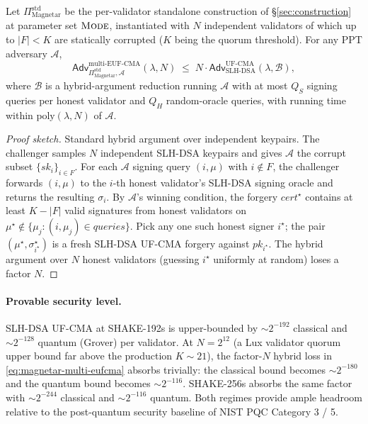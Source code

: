 \begin{theorem}
\label{thm:magnetar-multi-eufcma}
Let $\Pi^{\mathrm{std}}_{\mathrm{Magnetar}}$ be the per-validator
standalone construction of \S\ref{sec:construction} at parameter set
$\textsc{Mode}$, instantiated with $N$ independent validators of
which up to $|F| < K$ are statically corrupted ($K$ being the
quorum threshold). For any PPT adversary $\mathcal{A}$,
\begin{equation}
  \mathsf{Adv}^{\mathrm{multi\text{-}EUF\text{-}CMA}}_{
  \Pi^{\mathrm{std}}_{\mathrm{Magnetar}}, \mathcal{A}}(\lambda, N)
  \;\le\;
  N \cdot
  \mathsf{Adv}^{\mathrm{UF\text{-}CMA}}_{\mathrm{SLH\text{-}DSA}}(
  \lambda, \mathcal{B}),
\label{eq:magnetar-multi-eufcma}
\end{equation}
where $\mathcal{B}$ is a hybrid-argument reduction running
$\mathcal{A}$ with at most $Q_S$ signing queries per honest
validator and $Q_H$ random-oracle queries, with running time
within $\mathrm{poly}(\lambda, N)$ of $\mathcal{A}$.
\end{theorem}

\begin{proof}[Proof sketch]
Standard hybrid argument over independent keypairs. The
challenger samples $N$ independent SLH-DSA keypairs and gives
$\mathcal{A}$ the corrupt subset $\{sk_i\}_{i \in F}$. For each
$\mathcal{A}$ signing query $(i, \mu)$ with $i \notin F$, the
challenger forwards $(i, \mu)$ to the $i$-th honest validator's
SLH-DSA signing oracle and returns the resulting $\sigma_i$. By
$\mathcal{A}$'s winning condition, the forgery
$\mathit{cert}^\star$ contains at least $K - |F|$ valid
signatures from honest validators on $\mu^\star \notin
\{\mu_{j} : (i, \mu_j) \in \mathit{queries}\}$. Pick any one such
honest signer $i^\star$; the pair
$(\mu^\star, \sigma_{i^\star}^\star)$ is a fresh SLH-DSA UF-CMA
forgery against $pk_{i^\star}$. The hybrid argument over
$N$ honest validators (guessing $i^\star$ uniformly at random)
loses a factor $N$.
\end{proof}

\paragraph{Provable security level.} SLH-DSA UF-CMA at SHAKE-192s
is upper-bounded by $\sim 2^{-192}$ classical and $\sim 2^{-128}$
quantum (Grover) per validator. At $N = 2^{12}$ (a Lux validator
quorum upper bound far above the production $K \sim 21$), the
factor-$N$ hybrid loss in \eqref{eq:magnetar-multi-eufcma}
absorbs trivially: the classical bound becomes $\sim 2^{-180}$
and the quantum bound becomes $\sim 2^{-116}$. SHAKE-256s
absorbs the same factor with $\sim 2^{-244}$ classical and
$\sim 2^{-116}$ quantum. Both regimes provide ample headroom
relative to the post-quantum security baseline of NIST PQC
Category 3 / 5.

